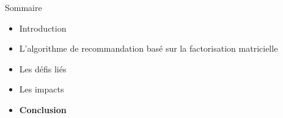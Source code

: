 \begin{frame}{Sommaire}
    \begin{itemize}
        \item Introduction
        \item L'algorithme de recommandation basé sur la factorisation matricielle
        \item Les défis liés
        \item Les impacts
        \item \textbf{Conclusion}
    \end{itemize}
\end{frame}
